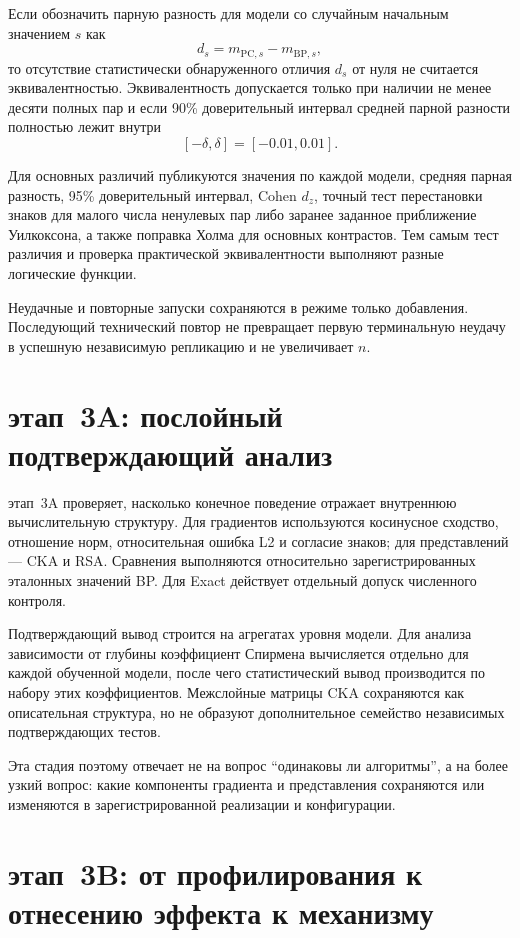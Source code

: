 Если обозначить парную разность для модели со случайным начальным значением
\(s\) как
\[
  d_s = m_{\mathrm{PC},s} - m_{\mathrm{BP},s},
\]
то отсутствие статистически обнаруженного отличия \(d_s\) от нуля не считается
эквивалентностью. Эквивалентность допускается только при наличии не менее
десяти полных пар и если 90\% доверительный интервал средней парной разности
полностью лежит внутри
\[
  [-\delta,\delta]=[-0.01,0.01].
\]

Для основных различий публикуются значения по каждой модели, средняя парная
разность, 95\% доверительный интервал, Cohen \(d_z\), точный тест перестановки
знаков для малого числа ненулевых пар либо заранее заданное приближение
Уилкоксона, а также поправка Холма для основных контрастов. Тем самым тест
различия и проверка практической эквивалентности выполняют разные логические
функции.

Неудачные и повторные запуски сохраняются в режиме только добавления.
Последующий технический повтор не превращает первую терминальную неудачу в
успешную независимую репликацию и не увеличивает \(n\).

\section{этап~3A: послойный подтверждающий анализ}
\label{sec:method-stage3a}

этап~3A проверяет, насколько конечное поведение отражает внутреннюю
вычислительную структуру. Для градиентов используются косинусное сходство,
отношение норм, относительная ошибка L2 и согласие знаков; для представлений ---
CKA и RSA. Сравнения выполняются относительно зарегистрированных эталонных
значений BP. Для Exact действует отдельный допуск численного контроля.

Подтверждающий вывод строится на агрегатах уровня модели. Для анализа
зависимости от глубины коэффициент Спирмена вычисляется отдельно для каждой
обученной модели, после чего статистический вывод производится по набору этих
коэффициентов. Межслойные матрицы CKA сохраняются как описательная структура,
но не образуют дополнительное семейство независимых подтверждающих тестов.

Эта стадия поэтому отвечает не на вопрос ``одинаковы ли алгоритмы'', а на более
узкий вопрос: какие компоненты градиента и представления сохраняются или
изменяются в зарегистрированной реализации и конфигурации.

\section{этап~3B: от профилирования к отнесению эффекта к механизму}
\label{sec:method-stage3b}


